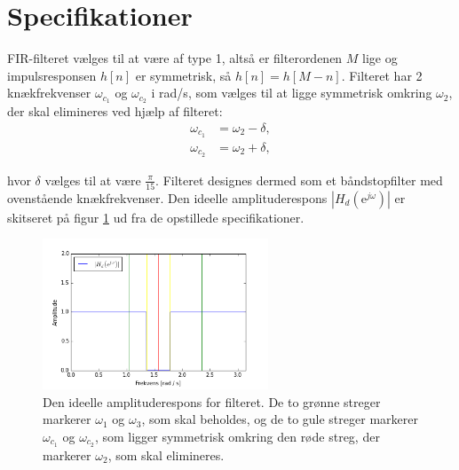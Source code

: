 \section{Specifikationer} \label{ch4_specs}
FIR-filteret vælges til at være af type 1, altså er filterordenen $M$ lige og impulsresponsen $h[n]$ er symmetrisk, så $h[n] = h[M - n]$. Filteret har 2 knækfrekvenser $\omega_{c_1}$ og $\omega_{c_2}$ i rad/s, som vælges til at ligge symmetrisk omkring $\omega_2$, der skal elimineres ved hjælp af filteret:
\begin{align*}
\omega_{c_1} &= \omega_2 - \delta, \\
\omega_{c_2} &= \omega_2 + \delta,
\end{align*}

hvor $\delta$ vælges til at være $\frac{\pi}{15}$. Filteret designes dermed som et båndstopfilter med ovenstående knækfrekvenser. Den ideelle amplituderespons $|H_d(\text{e}^{j\omega})|$ er skitseret på figur \ref{fig:ideel_amp_respons} ud fra de opstillede specifikationer.
\begin{figure}[H]
    \centering
    \includegraphics[width = 0.6\textwidth]{figures/Filter/ideel_amp_respons.PNG}
    \caption{Den ideelle amplituderespons for filteret. De to grønne streger markerer $\omega_1$ og $\omega_3$, som skal beholdes, og de to gule streger markerer $\omega_{c_1}$ og $\omega_{c_2}$, som ligger symmetrisk omkring den røde streg, der markerer $\omega_2$, som skal elimineres.}
    \label{fig:ideel_amp_respons}
\end{figure}
